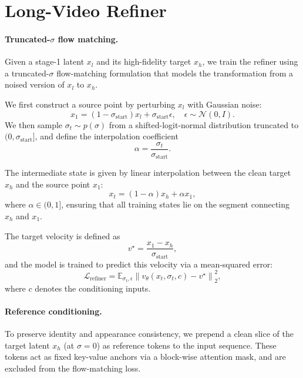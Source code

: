 \documentclass{llmxive}
\begin{document}
\section{Long-Video Refiner}
\label{sec:appendix_refiner}

\paragraph{Truncated-\texorpdfstring{$\sigma$}{...} flow matching.}
Given a stage-1 latent $x_l$ and its high-fidelity target $x_h$, we train the
refiner using a truncated-$\sigma$ flow-matching formulation that models the
transformation from a noised version of $x_l$ to $x_h$.

\noindent We first construct a source point by perturbing $x_l$ with Gaussian noise:
\begin{equation}
x_1 = (1 - \sigma_{\text{start}}) x_l + \sigma_{\text{start}} \epsilon,
\quad \epsilon \sim \mathcal{N}(0, I).
\end{equation}
We then sample $\sigma_t \sim p(\sigma)$ from a shifted-logit-normal
distribution truncated to $(0, \sigma_{\text{start}}]$, and define the
interpolation coefficient
\begin{equation}
    \alpha = \frac{\sigma_t}{\sigma_{\text{start}}}.
\end{equation}

\noindent The intermediate state is given by linear interpolation between the clean
target $x_h$ and the source point $x_1$:
\begin{equation}
    x_t = (1 - \alpha) x_h + \alpha x_1,
\end{equation}
where $\alpha \in (0,1]$, ensuring that all training states lie on the segment
connecting $x_h$ and $x_1$.

\noindent The target velocity is defined as
\begin{equation}
    v^\star = \frac{x_1 - x_h}{\sigma_{\text{start}}},
\end{equation}
and the model is trained to predict this velocity via a mean-squared error:
\begin{equation}
\mathcal{L}_{\text{refiner}} =
\mathbb{E}_{\sigma_t, \epsilon}
\left\| v_\theta(x_t, \sigma_t, c) - v^\star \right\|_2^2,    
\end{equation}
where $c$ denotes the conditioning inputs.

\paragraph{Reference conditioning.}
To preserve identity and appearance consistency, we prepend a clean slice of
the target latent $x_h$ (at $\sigma=0$) as reference tokens to the input
sequence. These tokens act as fixed key-value anchors via a block-wise
attention mask, and are excluded from the flow-matching loss.
\end{document}
